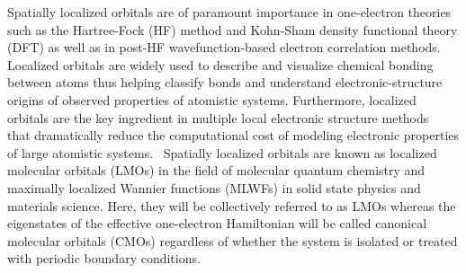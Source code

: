 \documentclass[aps,prl,reprint,amsmath,amssymb]{revtex4-1}
\begin{document}

Spatially localized orbitals are of paramount importance in one-electron theories such as the Hartree-Fock (HF) method and Kohn-Sham density functional theory (DFT) as well as in post-HF wavefunction-based electron correlation methods.
Localized orbitals are widely used to describe and visualize chemical bonding between atoms thus helping classify bonds and understand electronic-structure origins of observed properties of atomistic systems. 
Furthermore, localized orbitals are the key ingredient in multiple local electronic structure methods~\cite{goedecker1994efficient, bowler2012methods, zalesny2011linear, pulay1986orbital, saebo2001low, pisani2005local, hampel1996local, forner1997numerical} that dramatically reduce the computational cost of modeling electronic properties of large atomistic systems.~\cite{saebo1993local, schutz1999low, hetzer2000low, schutz2001low}
Spatially localized orbitals are known as localized molecular orbitals (LMOs) in the field of molecular quantum chemistry and maximally localized Wannier functions (MLWFs) in solid state physics and materials science. 
Here, they will be collectively referred to as LMOs whereas the eigenstates of the effective one-electron Hamiltonian will be called canonical molecular orbitals (CMOs) regardless of whether the system is isolated or treated with periodic boundary conditions.

%
\end{document}
